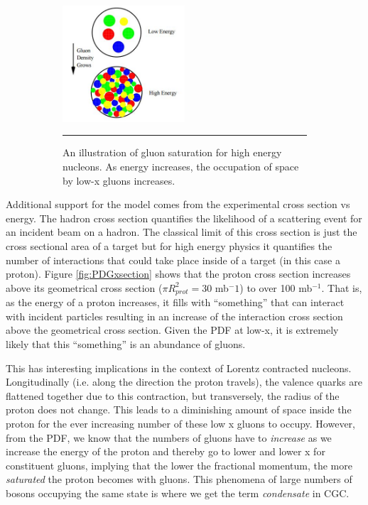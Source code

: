 \begin{figure}
\centering
\ContinuedFloat
\begin{subfigure}[h]{0.8\textwidth}
  \centering
    \includegraphics[width=0.5\textwidth]{Figures/gluondensityCGC.jpg}
  \caption[Illustration of gluon saturation in Color-Glass Condensate.]{An illustration of gluon saturation for high energy nucleons\citep{McLerran:2001sr}. As energy increases, the occupation of space by low-x gluons increases.}
  \label{fig:gluonsaturation}
    \rule{35em}{0.5pt}
\end{subfigure}
\caption{}
\end{figure}

Additional support for the model comes from the experimental cross section vs energy. The hadron cross section quantifies the likelihood of a scattering event for an incident beam on a hadron. The classical limit of this cross section is just the cross sectional area of a target but for high energy physics it quantifies the number of interactions that could take place inside of a target (in this case a proton). Figure \ref{fig:PDGxsection} shows that the proton cross section increases above its geometrical cross section ($\pi R_{prot}^2 = $30 mb${^-1}$) to over 100 mb$^{-1}$\citep{PDGcrosssection}\citep{Itakura2012}. That is, as the energy of a proton increases, it fills with ``something'' that can interact with incident particles resulting in an increase of the interaction cross section above the geometrical cross section. Given the PDF at low-x, it is extremely likely that this ``something'' is an abundance of gluons.

This has interesting implications in the context of Lorentz contracted nucleons. Longitudinally (i.e. along the direction the proton travels), the valence quarks are flattened together due to this contraction, but transversely, the radius of the proton does not change. This leads to a diminishing amount of space inside the proton for the ever increasing number of these low x gluons to occupy. However, from the PDF, we know that the numbers of gluons have to \textit{increase} as we increase the energy of the proton and thereby go to lower and lower x for constituent gluons, implying that the lower the fractional momentum, the more \textit{saturated} the proton becomes with gluons. This phenomena of large numbers of bosons occupying the same state is where we get the term \textit{condensate} in CGC.

